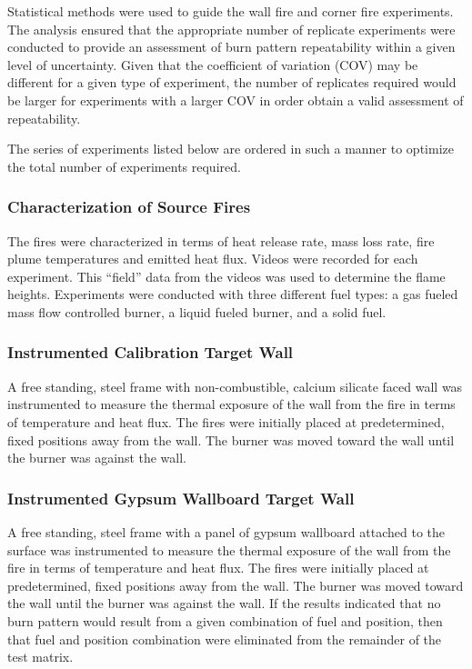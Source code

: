 \documentclass[twoside]{uocthesis}
\begin{document}
Statistical methods were used to guide the wall fire and corner fire experiments.  The analysis ensured that the appropriate number of replicate experiments were conducted to provide an assessment of burn pattern repeatability within a given level of uncertainty.  Given that the coefficient of variation (COV) may be different for a given type of experiment, the number of replicates required would be larger for experiments with a larger COV in order obtain a valid assessment of repeatability.

The series of experiments listed below are ordered in such a manner to optimize the total number of experiments required.

\subsubsection{Characterization of Source Fires}

The fires were characterized in terms of heat release rate, mass loss rate, fire plume temperatures and emitted heat flux. Videos were recorded for each experiment.  This ``field'' data from the videos was  used to determine the flame heights. Experiments were conducted with three different fuel types: a gas fueled mass flow controlled burner, a liquid fueled burner, and a solid fuel.

\subsubsection{Instrumented Calibration Target Wall}

A free standing, steel frame with non-combustible, calcium silicate faced wall was instrumented to measure the thermal exposure of the wall from the fire in terms of temperature and heat flux.  The fires were initially placed at predetermined, fixed positions away from the wall. The burner was moved toward the wall until the burner was against the wall.

\subsubsection{Instrumented Gypsum Wallboard Target Wall}

A free standing, steel frame with a panel of gypsum wallboard attached to the surface was instrumented to measure the thermal exposure of the wall from the fire in terms of temperature and heat flux.  The fires were initially placed at predetermined, fixed positions away from the wall. The burner was moved toward the wall until the burner was against the wall.  If the results indicated that no burn pattern would result from a given combination of fuel and position, then that fuel and position combination were eliminated from the remainder of the test matrix.
\end{document}
